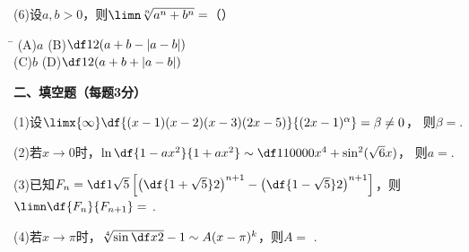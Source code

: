 (6)\;设$a,b>0$，则$\limn\sqrt[n]{a^n+b^n}=$（\quad）%

\begin{tabbing}
	\hspace{8cm}\=\kill
	\quad\quad\quad(A)\;$a$ 
	\> (B)\;$\df12(a+b-|a-b|)$\\ 
	\quad\quad\quad(C)\;$b$
	\>	(D)\;$\df12(a+b+|a-b|)$ 
\end{tabbing}

% 

{\bf 二、填空题（每题3分）}

(1)\;设$\limx{\infty}\df{(x-1)(x-2)(x-3)(2x-5)}{(2x-1)^{\alpha}}=\beta\ne 0$，
则$\beta=$\underline{\hspace{4cm}}.

(2)\;若$x\to0$时，$\ln\df{1-ax^2}{1+ax^2}\sim\df1{10000}x^4+\sin^2(\sqrt6x)$，
则$a=$\underline{\hspace{4cm}}.

(3)\;已知$F_n=\df1{\sqrt5}\left[\left(\df{1+\sqrt5}2\right)^{n+1}
-\left(\df{1-\sqrt5}2\right)^{n+1}\right]$，则$\limn\df{F_n}{F_{n+1}}=$
\underline{\hspace{4cm}}.

(4)\;若$x\to\pi$时，$\sqrt[4]{\sin\df x2}-1\sim A(x-\pi)^k$，则$A=$
\underline{\hspace{4cm}}.

\bigskip

